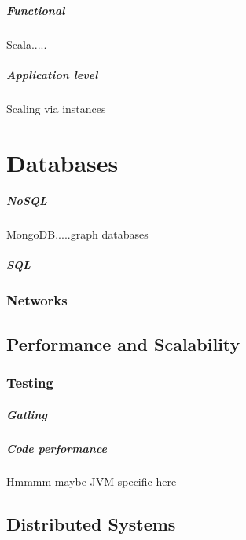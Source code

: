 \documentclass[a4paper, 11pt]{book}
\begin{document}
    \paragraph{Functional}
    Scala.....

    \paragraph{Application level}
    Scaling via instances


    \chapter{Databases}

    \paragraph{NoSQL}
    MongoDB.....graph databases

    \paragraph{SQL}

    \subsection{Networks}


    \section{Performance and Scalability}

    \subsection{Testing}

    \paragraph{Gatling}

    \paragraph{Code performance}
    Hmmmm maybe JVM specific here


    \section{Distributed Systems}
\end{document}
